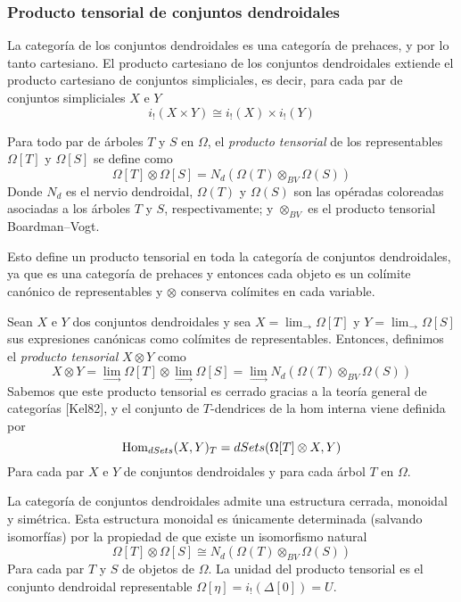 \documentclass[../main.tex]{subfiles}
\begin{document}
\subsubsection{Producto tensorial de conjuntos dendroidales}
La categor\'ia de los conjuntos dendroidales es una categor\'ia de prehaces, y por lo tanto cartesiano.
El producto cartesiano de los conjuntos dendroidales extiende el producto cartesiano de conjuntos simpliciales, es decir, para cada par de conjuntos simpliciales $X$ e $Y$
$$
    i_!(X\times Y) \cong i_!(X)\times i_!(Y)
$$
\begin{defi}
    Para todo par de \'arboles $T$ y $S$ en $\Omega$, el \emph{producto tensorial} de los representables $\Omega[T]$ y $\Omega[S]$ se define como
    $$
        \Omega[T]\otimes\Omega[S] = N_d(\Omega(T)\otimes_{BV}\Omega(S))
    $$
    Donde $N_d$ es el nervio dendroidal, $\Omega(T)$ y $\Omega(S)$ son las op\'eradas coloreadas asociadas a los \'arboles $T$ y $S$, respectivamente; y $\otimes_{BV}$ es el producto tensorial Boardman--Vogt.

    Esto define un producto tensorial en toda la categor\'ia de conjuntos dendroidales, ya que es una categor\'ia de prehaces y entonces cada objeto es un col\'imite can\'onico de representables y $\otimes$ conserva col\'imites en cada variable.
\end{defi}
\begin{defi}
    Sean $X$ e $Y$ dos conjuntos dendroidales y sea $X = \lim_{\to}\Omega[T]$ y $Y = \lim_{\to}\Omega[S]$ sus expresiones can\'onicas como col\'imites de representables. Entonces, definimos el \emph{producto tensorial} $X\otimes Y$ como
    $$
        X\otimes Y = \lim_{\to}\Omega[T]\otimes\lim_{\to}\Omega[S] = \lim_{\to} N_d(\Omega(T)\otimes_{BV}\Omega(S))
    $$
    Sabemos que este producto tensorial es cerrado gracias a la teor\'ia general de categor\'ias [Kel82], y el conjunto de $T$-dendrices de la hom interna viene definida por
    $$
        {\rm Hom}_{dSets}(X,Y)_T = dSets(\Omega[T]\otimes X, Y)
    $$
    Para cada par $X$ e $Y$ de conjuntos dendroidales y para cada \'arbol $T$ en $\Omega$.
\end{defi}
\begin{teo}
    La categor\'ia de conjuntos dendroidales admite una estructura cerrada, monoidal y sim\'etrica. Esta estructura monoidal es \'unicamente determinada (salvando isomorf\'ias) por la propiedad de que existe un isomorfismo natural
    $$
        \Omega[T]\otimes\Omega[S] \cong N_d(\Omega(T)\otimes_{BV}\Omega(S))
    $$
    Para cada par $T$ y $S$ de objetos de $\Omega$. La unidad del producto tensorial es el conjunto dendroidal representable $\Omega[\eta]=i_!(\Delta[0]) = U$.
\end{teo}
\end{document}
